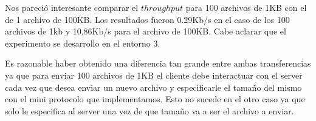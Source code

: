 Nos pareció interesante comparar el $throughput$ para 100 archivos de 1KB con el de 1 archivo de 100KB. Los resultados fueron 0.29Kb/s en el caso de los 100 archivos de 1kb y 10,86Kb/s para el archivo de 100KB. Cabe aclarar que el experimento se desarrollo en el entorno 3.

Es razonable haber obtenido una diferencia tan grande entre ambas transferencias ya que para enviar 100 archivos de 1KB el cliente debe interactuar con el server cada vez que desea enviar un nuevo archivo y especificarle el tamaño del mismo con el mini protocolo que implementamos. Esto no sucede en el otro caso ya que solo le especifica al server una vez de que tamaño va a ser el archivo a enviar.
